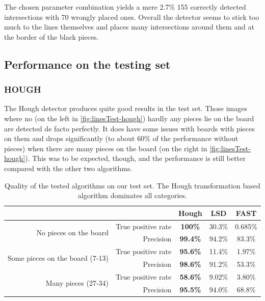 	The chosen parameter combination yields a mere 2.7\% 155 correctly detected intersections with 70 wrongly placed ones. Overall the detector seems to stick too much to the lines themselves and places many intersections around them and at the border of the black pieces. %

	\subsection{Performance on the testing set}
	\label{evaluation-visible-performance}
	\subsubsection{HOUGH}
	\label{evaluation-visible-performance-hough}
	The Hough detector produces quite good results in the test set. Those images where no (on the left in \autoref{fig:linesTest-hough}) hardly any pieces lie on the board are detected de facto perfectly. It does have some issues with boards with pieces on them and drops significantly (to about 60\% of the performance without pieces) when there are many pieces on the board (on the right in \autoref{fig:linesTest-hough}). This was to be expected, though, and the performance is still better compared with the other two algorithms.

	\begin{table}[b]
		\begin{tabular}{|r|r||>{\bfseries}c|c|c|}
			\cline{3-5}
		    \multicolumn{2}{c|}{}											 		& Hough 	& LSD 		& FAST     \\
			\cline{3-5}
			\hline
			\multirow{2}{*}{No pieces on the board}   		& True positive rate 	& 100\% 	& 30.3\%  	& 0.685\%  \\
															& Precision			 	& 99.4\% 	& 94.2\%  	& 83.3\%  \\
			\hline
			\multirow{2}{*}{Some pieces on the board (7-13)}& True positive rate 	& 95.6\% 	& 11.4\% 	& 1.97\%   \\
															& Precision 			& 98.6\% 	& 91.2\%  	& 53.3\%  \\
			\hline
			\multirow{2}{*}{Many pieces (27-34)} 			& True positive rate 	& 58.6\% 	& 9.02\% 	& 3.80\%   \\
															& Precision			 	& 95.5\% 	& 94.0\%  	& 68.8\%  \\
			\hline
		\end{tabular}
		\caption{Quality of the tested algorithms on our test set. The Hough transformation based algorithm dominates all categories.}
		\label{tab:linesTest}
	\end{table}

